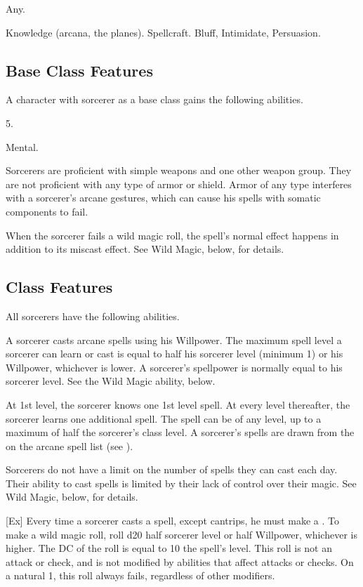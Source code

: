  Any.

 Knowledge (arcana, the planes).
 Spellcraft.
 Bluff, Intimidate, Persuasion.

\subsection{Base Class Features}
A character with sorcerer as a base class gains the following abilities.

 5.

  Mental.

Sorcerers are proficient with simple weapons  and one other weapon group.
They are not proficient with any type of armor or shield.
Armor of any type interferes with a sorcerer's arcane gestures, which can cause his spells with somatic components to fail.

When the sorcerer fails a wild magic roll, the spell's normal effect happens in addition to its miscast effect.
See Wild Magic, below, for details.

\subsection{Class Features}
All sorcerers have the following abilities.

A sorcerer casts arcane spells using his Willpower.
The maximum spell level a sorcerer can learn or cast is equal to half his sorcerer level (minimum 1) or his Willpower, whichever is lower.
A sorcerer's spellpower is normally equal to his sorcerer level.
See the Wild Magic ability, below.

At 1st level, the sorcerer knows one 1st level spell.
At every level thereafter, the sorcerer learns one additional spell.
The spell can be of any level, up to a maximum of half the sorcerer's class level.
A sorcerer's spells are drawn from the  on the arcane spell list (see ).

Sorcerers do not have a limit on the number of spells they can cast each day.
Their ability to cast spells is limited by their lack of control over their magic.
See Wild Magic, below, for details.

[Ex]\label{Wild Magic}
Every time a sorcerer casts a spell, except cantrips, he must make a .
To make a wild magic roll, roll d20 \add half sorcerer level or half Willpower, whichever is higher.
The DC of the roll is equal to 10 \add the spell's level.
This roll is not an attack or check, and is not modified by abilities that affect attacks or checks.
On a natural 1, this roll always fails, regardless of other modifiers.

